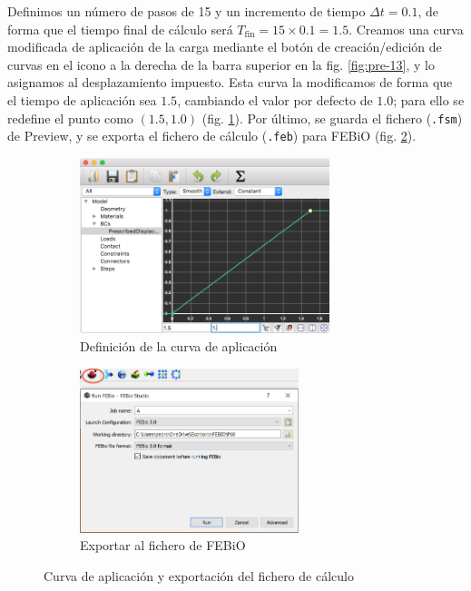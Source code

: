 Definimos un número de pasos de 15 y un incremento de tiempo $\Delta t=0.1$, de forma que el tiempo final de cálculo será $T_\text{fin}=15\times 0.1=1.5$. 
Creamos una curva modificada de aplicación de la carga mediante el botón de creación/edición de curvas en el icono a la derecha de la barra superior en la fig. \ref{fig:pre-13}, y lo asignamos al desplazamiento impuesto.
Esta curva la modificamos de forma que el tiempo de aplicación sea $1.5$, cambiando el valor por defecto de $1.0$; para ello se redefine el punto como $(1.5, 1.0)$ (fig. \ref{fig:pre-14}).
Por último, se guarda el fichero (\texttt{.fsm}) de Preview, y se exporta el fichero de cálculo (\texttt{.feb}) para FEBiO (fig. \ref{fig:pre-15}).
\begin{figure}[!htp]
\centering
\begin{subfigure}[b]{0.48\textwidth}
\centering
\includegraphics[width=0.8\textwidth]{figuras_3/scr-pre-14.png}
\caption{Definición de la curva de aplicación}
\label{fig:pre-14}
\end{subfigure}
\begin{subfigure}[b]{0.48\textwidth}
\centering
\includegraphics[width=0.7\textwidth]{figuras_3/scr-pre-15.png}
\caption{Exportar al fichero de FEBiO}
\label{fig:pre-15}
\end{subfigure}
\caption{Curva de aplicación y exportación del fichero de cálculo}
\label{fig:pre-14-15}
\end{figure}

